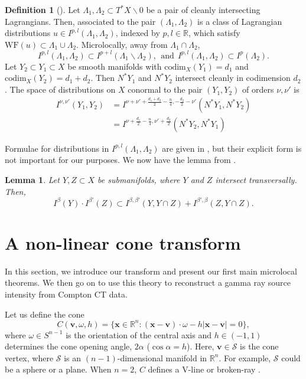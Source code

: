 \documentclass[a4paper,12pt]{amsart}
\numberwithin{equation}{section}
\theoremstyle{plain}
\numberwithin{theorem}{section}
\newtheorem{lemma}[theorem]{Lemma}
\theoremstyle{definition}
\newtheorem{definition}[theorem]{Definition}
\theoremstyle{remark}
\theoremstyle{remark}
\theoremstyle{remark}
\newcommand{\s}{\mathcal S}
\newcommand{\WF}{\mathrm{WF}}
\newcommand{\vv}{{\mathbf{v}}}
\newcommand{\vx}{{\mathbf{x}}}
\begin{document}
\begin{definition}[\cite{greenleaf1993recovering}]
\label{pair_lag}
Let $\Lambda_1,\Lambda_2 \subset T^*X\backslash 0$ be a pair of cleanly intersecting Lagrangians. Then, associated to the pair $(\Lambda_1, \Lambda_2)$ is a class of Lagrangian distributions $u\in I^{p,l}(\Lambda_1, \Lambda_2)$, indexed by $p,l\in \mathbb{R}$, which satisfy $\WF(u) \subset \Lambda_1 \cup \Lambda_2$. Microlocally, away from $\Lambda_1 \cap \Lambda_2$,
$$I^{p,l}(\Lambda_1,\Lambda_2) \subset I^{p+l}(\Lambda_1 \backslash \Lambda_2),\ \ \text{and}\ \ I^{p,l}(\Lambda_1,\Lambda_2) \subset I^p(\Lambda_2).$$
Let $Y_2 \subset Y_1 \subset X$ be smooth manifolds with $\text{codim}_X(Y_1) = d_1$ and $\text{codim}_X(Y_2) = d_1 + d_2$. Then $N^*Y_1$ and $N^*Y_2$ intersect cleanly in codimension $d_2$. The space of distributions on $X$ conormal to the pair $(Y_1,Y_2)$ of orders $\nu, \nu'$ is
\begin{equation}\label{pair_lag_e}
\begin{split}
I^{\nu,\nu'}(Y_1,Y_2) &= I^{\nu + \nu' + \frac{d_1 +d_2}{2}-\frac{n}{4},-\frac{d_2}{2}-\nu'}(N^*Y_1, N^* Y_2)\\
&= I^{\nu + \frac{d_1}{2}-\frac{n}{4},\nu'+\frac{d_2}{2}}(N^*Y_2, N^* Y_1)
\end{split}
\end{equation}
\end{definition}

Formulae for distributions in $I^{p,l}(\Lambda_1,\Lambda_2)$ are given in \cite{greenleaf1993recovering}, but their explicit form is not important for our purposes. We now have the lemma from \cite[Lemma 1.1]{greenleaf1993recovering}.
\begin{lemma}
\label{lem_green}
Let $Y, Z \subset X$ be submanifolds, where $Y$ and $Z$ intersect transversally. Then, 
$$I^\beta(Y)\cdot I^{\beta'}(Z) \subset I^{\beta,\beta'}(Y,Y \cap Z)  + I^{\beta',\beta}(Z,Y \cap Z).$$
\end{lemma}

\section{A non-linear cone transform}
\label{main}
In this section, we introduce our transform and present our first main microlocal theorems. We then go on to use this theory to reconstruct  a gamma ray source intensity from Compton CT data. 

Let us define the cone
$$C(\vv, \omega, h) = \{ \vx \in \mathbb{R}^n : (\vx - \vv) \cdot \omega - h|\vx - \vv| = 0\},$$
where $\omega \in S^{n-1}$ is the orientation of the central axis and $h \in (-1,1)$ determines the cone opening angle, $2\alpha$ ($\cos\alpha = h$). Here, $\vv\in \s$ is the cone vertex, where $\s$ is an $(n-1)$-dimensional manifold in $\mathbb{R}^n$. For example, $\s$ could be a sphere or a plane. When $n = 2$, $C$ defines a V-line or broken-ray \cite{AmbartsoumianLatifi-Vline2019}.
\end{document}
